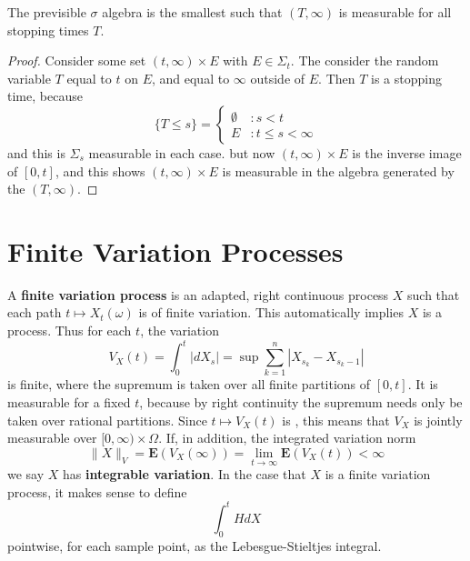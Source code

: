 \begin{corollary}
    The previsible $\sigma$ algebra is the smallest such that $(T,\infty)$ is measurable for all stopping times $T$.
\end{corollary}
\begin{proof}
    Consider some set $(t,\infty) \times E$ with $E \in \Sigma_t$. The consider the random variable $T$ equal to $t$ on $E$, and equal to $\infty$ outside of $E$. Then $T$ is a stopping time, because
    \[ \{ T \leq s \} = \begin{cases} \emptyset & : s < t \\ E & : t \leq s < \infty \end{cases} \]
    and this is $\Sigma_s$ measurable in each case. but now $(t,\infty) \times E$ is the inverse image of $[0,t]$, and this shows $(t,\infty) \times E$ is measurable in the algebra generated by the $(T,\infty)$.
\end{proof}

\section{Finite Variation Processes}

A {\bf finite variation process} is an adapted, right continuous process $X$ such that each path $t \mapsto X_t(\omega)$ is of finite variation. This automatically implies $X$ is a \cadlag process. Thus for each $t$, the variation
%
\[ V_X(t) = \int_0^t |dX_s| = \sup \sum_{k = 1}^n |X_{s_k} - X_{s_k - 1}| \]
%
is finite, where the supremum is taken over all finite partitions of $[0,t]$. It is measurable for a fixed $t$, because by right continuity the supremum needs only be taken over rational partitions. Since $t \mapsto V_X(t)$ is \cadlag, this means that $V_X$ is jointly measurable over $[0,\infty) \times \Omega$. If, in addition, the integrated variation norm
%
\[ \| X \|_V = \mathbf{E}(V_X(\infty)) = \lim_{t \to \infty} \mathbf{E}(V_X(t)) < \infty \]
%
we say $X$ has {\bf integrable variation}. In the case that $X$ is a finite variation process, it makes sense to define
%
\[ \int_0^t H dX \]
%
pointwise, for each sample point, as the Lebesgue-Stieltjes integral.

